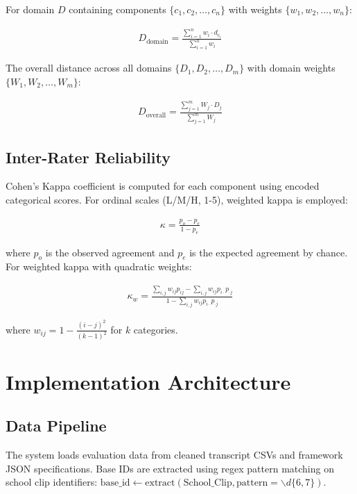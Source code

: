 \documentclass[12pt]{article}
\begin{document}
For domain $D$ containing components $\{c_1, c_2, \ldots, c_n\}$ with weights $\{w_1, w_2, \ldots, w_n\}$:

\begin{align}
D_{\text{domain}} = \frac{\sum_{i=1}^{n} w_i \cdot d_{c_i}}{\sum_{i=1}^{n} w_i}
\end{align}

The overall distance across all domains $\{D_1, D_2, \ldots, D_m\}$ with domain weights $\{W_1, W_2, \ldots, W_m\}$:

\begin{align}
D_{\text{overall}} = \frac{\sum_{j=1}^{m} W_j \cdot D_j}{\sum_{j=1}^{m} W_j}
\end{align}

\subsection{Inter-Rater Reliability}

Cohen's Kappa coefficient is computed for each component using encoded categorical scores. For ordinal scales (L/M/H, 1-5), weighted kappa is employed:

\begin{align}
\kappa = \frac{p_o - p_e}{1 - p_e}
\end{align}

where $p_o$ is the observed agreement and $p_e$ is the expected agreement by chance. For weighted kappa with quadratic weights:

\begin{align}
\kappa_w = \frac{\sum_{i,j} w_{ij} p_{ij} - \sum_{i,j} w_{ij} p_{i \cdot} p_{\cdot j}}{1 - \sum_{i,j} w_{ij} p_{i \cdot} p_{\cdot j}}
\end{align}

where $w_{ij} = 1 - \frac{(i-j)^2}{(k-1)^2}$ for $k$ categories.

\section{Implementation Architecture}

\subsection{Data Pipeline}
The system loads evaluation data from cleaned transcript CSVs and framework JSON specifications. Base IDs are extracted using regex pattern matching on school clip identifiers: $\text{base\_id} \leftarrow \text{extract}(\text{School\_Clip}, \text{pattern} = \backslash d\{6,7\})$.
\end{document}

